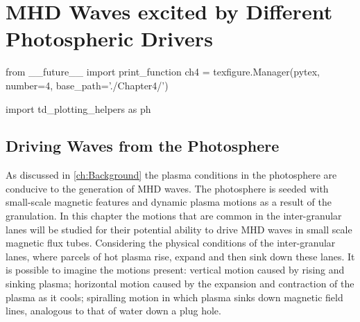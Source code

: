 
\chapter{MHD Waves excited by Different Photospheric Drivers}\label{ch:drivers}

\begin{pycode}[chapter4]
from __future__ import print_function
ch4 = texfigure.Manager(pytex, number=4, base_path='./Chapter4/')

import td_plotting_helpers as ph
\end{pycode}


\section{Driving Waves from the Photosphere}\label{sec:5drivers}

As discussed in \cref{ch:Background} the plasma conditions in the photosphere are conducive to the generation of MHD waves.
The photosphere is seeded with small-scale magnetic features and dynamic plasma motions as a result of the granulation.
In this chapter the motions that are common in the inter-granular lanes will be studied for their potential ability to drive MHD waves in small scale magnetic flux tubes.
Considering the physical conditions of the inter-granular lanes, where parcels of hot plasma rise, expand and then sink down these lanes.
It is possible to imagine the motions present: vertical motion caused by rising and sinking plasma; horizontal motion caused by the expansion and contraction of the plasma as it cools; spiralling motion in which plasma sinks down magnetic field lines, analogous to that of water down a plug hole.

